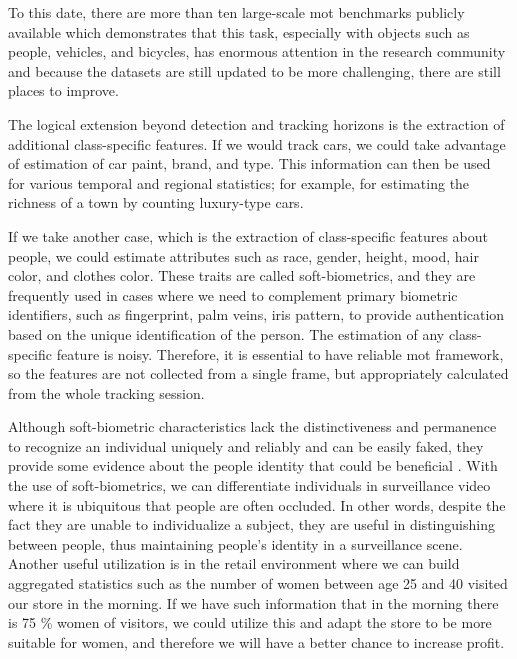 \begin{introduction}
        To this date, there are more than ten large-scale \gls{mot} benchmarks publicly available which demonstrates that this task, especially with objects such as people, vehicles, and bicycles, has enormous attention in the research community and because the datasets are still updated to be more challenging, there are still places to improve. 
        
        The logical extension beyond detection and tracking horizons is the extraction of additional class-specific features. If we would track cars, we could take advantage of estimation of car paint, brand, and type. This information can then be used for various temporal and regional statistics; for example, for estimating the richness of a town by counting luxury-type cars. 
        
        If we take another case, which is the extraction of class-specific features about people, we could estimate attributes such as race, gender, height, mood, hair color, and clothes color. These traits are called soft-biometrics, and they are frequently used in cases where we need to complement primary biometric identifiers, such as fingerprint, palm veins, iris pattern, to provide authentication based on the unique identification of the person. The estimation of any class-specific feature is noisy. Therefore, it is essential to have reliable \gls{mot} framework, so the features are not collected from a single frame, but appropriately calculated from the whole tracking session.
        
        Although soft-biometric characteristics lack the distinctiveness and permanence to recognize an individual uniquely and reliably and can be easily faked, they provide some evidence about the people identity that could be beneficial \cite{wiki:biometrics}. With the use of soft-biometrics, we can differentiate individuals in surveillance video where it is ubiquitous that people are often occluded. In other words, despite the fact they are unable to individualize a subject, they are useful in distinguishing between people, thus maintaining people's identity in a surveillance scene. Another useful utilization is in the retail environment where we can build aggregated statistics such as the number of women between age 25 and 40 visited our store in the morning. If we have such information that in the morning there is 75 \% women of visitors, we could utilize this and adapt the store to be more suitable for women, and therefore we will have a better chance to increase profit.
        

\end{introduction}
